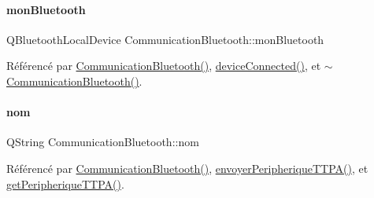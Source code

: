 \mbox{\label{class_communication_bluetooth_abc0a9f1ce7a055021027ebc841154c9c}} 
\paragraph{\texorpdfstring{mon\+Bluetooth}{monBluetooth}}
{\footnotesize\ttfamily Q\+Bluetooth\+Local\+Device Communication\+Bluetooth\+::mon\+Bluetooth\hspace{0.3cm}{\ttfamily [private]}}



Référencé par \hyperlink{class_communication_bluetooth_aa759c75b0df7f7e237eec495f156bba0}{Communication\+Bluetooth()}, \hyperlink{class_communication_bluetooth_a046af482ca42ce0071aee1b2cf3a1a44}{device\+Connected()}, et \hyperlink{class_communication_bluetooth_a13c72d24359f40c204e94f3ef1ab6fd3}{$\sim$\+Communication\+Bluetooth()}.

\mbox{\label{class_communication_bluetooth_a320cc60a0cb6b4ea9e009fef2853f1d2}} 
\paragraph{\texorpdfstring{nom}{nom}}
{\footnotesize\ttfamily Q\+String Communication\+Bluetooth\+::nom\hspace{0.3cm}{\ttfamily [private]}}



Référencé par \hyperlink{class_communication_bluetooth_aa759c75b0df7f7e237eec495f156bba0}{Communication\+Bluetooth()}, \hyperlink{class_communication_bluetooth_a73d95b841bf64a4463760435a41fc219}{envoyer\+Peripherique\+T\+T\+P\+A()}, et \hyperlink{class_communication_bluetooth_a1baec10cc16afe1a87cbad635a82c323}{get\+Peripherique\+T\+T\+P\+A()}.

\mbox{\label{class_communication_bluetooth_a03c857db65a9ea5a0b944844f675e6fa}} 
